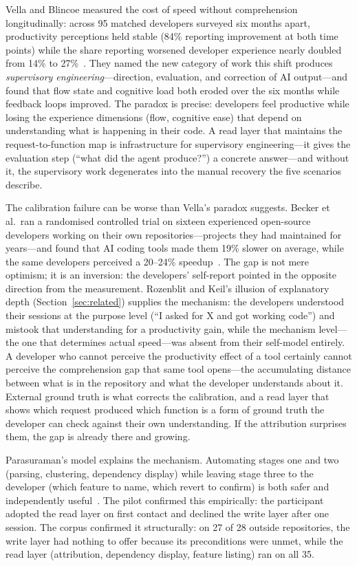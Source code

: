 Vella and Blincoe measured the cost of speed without comprehension longitudinally:
across 95 matched developers surveyed six months apart, productivity perceptions
held stable (84\% reporting improvement at both time points) while the share
reporting worsened developer experience nearly doubled from 14\% to
27\%~\cite{vella2026longitudinal}. They named the new category of work this shift
produces \emph{supervisory engineering}---direction, evaluation, and correction of
AI output---and found that flow state and cognitive load both eroded over the six
months while feedback loops improved. The paradox is precise: developers feel
productive while losing the experience dimensions (flow, cognitive ease) that
depend on understanding what is happening in their code. A read layer that
maintains the request-to-function map is infrastructure for supervisory
engineering---it gives the evaluation step (``what did the agent produce?'')
a concrete answer---and without it, the supervisory work degenerates into the
manual recovery the five scenarios describe.

The calibration failure can be worse than Vella's paradox suggests. Becker et
al.\ ran a randomised controlled trial on sixteen experienced open-source
developers working on their own repositories---projects they had maintained for
years---and found that AI coding tools made them 19\% slower on average, while
the same developers perceived a 20--24\% speedup~\cite{becker2025metr}. The
gap is not mere optimism; it is an inversion: the developers' self-report
pointed in the opposite direction from the measurement. Rozenblit and Keil's
illusion of explanatory depth (Section~\ref{sec:related}) supplies the
mechanism: the developers understood their sessions at the purpose level (``I
asked for X and got working code'') and mistook that understanding for a
productivity gain, while the mechanism level---the one that determines actual
speed---was absent from their self-model entirely. A developer who cannot
perceive the productivity effect of a tool certainly cannot perceive the
comprehension gap that same tool opens---the accumulating distance between what
is in the repository and what the developer understands about it. External
ground truth is what corrects the calibration, and a read layer that shows which
request produced which function is a form of ground truth the developer can
check against their own understanding. If the attribution surprises them, the
gap is already there and growing.

Parasuraman's model explains the mechanism. Automating stages one and two (parsing,
clustering, dependency display) while leaving stage three to the developer
(which feature to name, which revert to confirm) is both safer and independently
useful~\cite{parasuraman2000}. The pilot confirmed this empirically: the
participant adopted the read layer on first contact and declined the write layer
after one session. The corpus confirmed it structurally: on 27 of 28 outside
repositories, the write layer had nothing to offer because its preconditions
were unmet, while the read layer (attribution, dependency display, feature
listing) ran on all 35.

